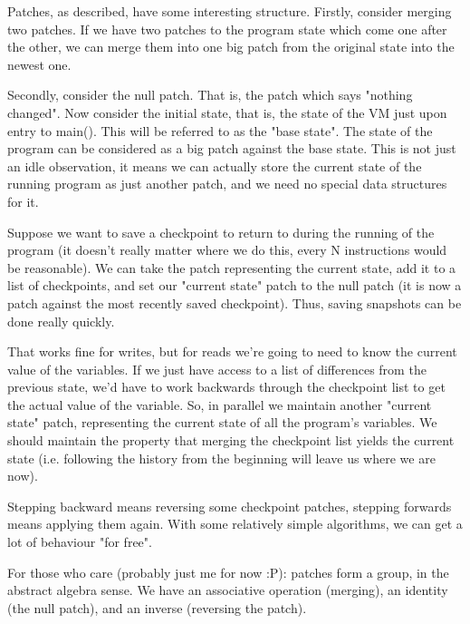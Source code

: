Patches, as described, have some interesting structure. Firstly, consider merging two patches. If we have two patches to the program state which come one after the other, we can merge them into one big patch from the original state into the newest one.
\par
Secondly, consider the null patch. That is, the patch which says "nothing changed". Now consider the initial state, that is, the state of the VM just upon entry to main(). This will be referred to as the "base state". The state of the program can be considered as a big patch against the base state. This is not just an idle observation, it means we can actually store the current state of the running program as just another patch, and we need no special data structures for it.
\par
Suppose we want to save a checkpoint to return to during the running of the program (it doesn't really matter where we do this, every N instructions would be reasonable). We can take the patch representing the current state, add it to a list of checkpoints, and set our "current state" patch to the null patch (it is now a patch against the most recently saved checkpoint). Thus, saving snapshots can be done really quickly.
\par
That works fine for writes, but for reads we're going to need to know the current value of the variables. If we just have access to a list of differences from the previous state, we'd have to work backwards through the checkpoint list to get the actual value of the variable. So, in parallel we maintain another "current state" patch, representing the current state of all the program's variables. We should maintain the property that merging the checkpoint list yields the current state (i.e. following the history from the beginning will leave us where we are now).
\par
Stepping backward means reversing some checkpoint patches, stepping forwards means applying them again. With some relatively simple algorithms, we can get a lot of behaviour "for free".
\par
For those who care (probably just me for now :P): patches form a group, in the abstract algebra sense. We have an associative operation (merging), an identity (the null patch), and an inverse (reversing the patch).
